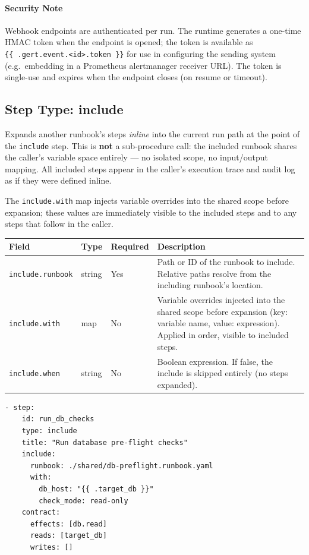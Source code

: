 \paragraph{Security Note}

Webhook endpoints are authenticated per run.  The runtime generates a one-time
HMAC token when the endpoint is opened; the token is available as
\texttt{\{\{\ .gert.event.<id>.token\ \}\}} for use in configuring the sending
system (e.g.\ embedding in a Prometheus alertmanager receiver URL).  The token
is single-use and expires when the endpoint closes (on resume or timeout).

\subsection{Step Type: include}
\label{subsec:step-include}

Expands another runbook's steps \emph{inline} into the current run path at the
point of the \texttt{include} step.  This is \textbf{not} a sub-procedure call:
the included runbook shares the caller's variable space entirely — no isolated
scope, no input/output mapping.  All included steps appear in the caller's
execution trace and audit log as if they were defined inline.

The \texttt{include.with} map injects variable overrides into the shared scope
before expansion; these values are immediately visible to the included steps and
to any steps that follow in the caller.

\begin{center}
\begin{tabular}{lllp{5.5cm}}
\hline
\textbf{Field} & \textbf{Type} & \textbf{Required} & \textbf{Description} \\
\hline
\texttt{include.runbook}  & string & Yes & Path or ID of the runbook to include. Relative paths resolve from the including runbook's location. \\
\texttt{include.with}     & map    & No  & Variable overrides injected into the shared scope before expansion (key: variable name, value: expression). Applied in order, visible to included steps. \\
\texttt{include.when}     & string & No  & Boolean expression. If false, the include is skipped entirely (no steps expanded). \\
\hline
\end{tabular}
\end{center}

\begin{verbatim}
- step:
    id: run_db_checks
    type: include
    title: "Run database pre-flight checks"
    include:
      runbook: ./shared/db-preflight.runbook.yaml
      with:
        db_host: "{{ .target_db }}"
        check_mode: read-only
    contract:
      effects: [db.read]
      reads: [target_db]
      writes: []
\end{verbatim}

